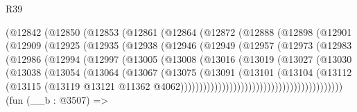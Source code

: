 \begin{lexlean}{R39}
\begin{coremodule}
              (@12842
                (@12850
                  (@12853
                    (@12861
                      (@12864
                        (@12872
                          (@12888
                            (@12898
                              (@12901
                                (@12909
                                  (@12925
                                    (@12935
                                      (@12938
                                        (@12946
                                          (@12949
                                            (@12957
                                              (@12973
                                                (@12983
                                                  (@12986
                                                    (@12994
                                                      (@12997
                                                        (@13005
                                                          (@13008
                                                            (@13016
                                                              (@13019
                                                                (@13027
                                                                  (@13030
                                                                    (@13038
                                                                      (@13054
                                                                        (@13064
                                                                          (@13067
                                                                            (@13075
                                                                              (@13091
                                                                                (@13101
                                                                                  (@13104
                                                                                    (@13112
                                                                                      (@13115
                                                                                        (@13119
                                                                                          @13121
                                                                                          @11362
                                                                                          @4062)))))))))))))))))))))))))))))))))))))))))))
    (fun (__b : @3507) =>

\end{coremodule}
\end{lexlean}

